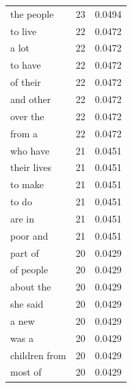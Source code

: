 \begin{tabular}{lrl}
the people & 23 & 0.0494 \\
to live & 22 & 0.0472 \\
a lot & 22 & 0.0472 \\
to have & 22 & 0.0472 \\
of their & 22 & 0.0472 \\
and other & 22 & 0.0472 \\
over the & 22 & 0.0472 \\
from a & 22 & 0.0472 \\
who have & 21 & 0.0451 \\
their lives & 21 & 0.0451 \\
to make & 21 & 0.0451 \\
to do & 21 & 0.0451 \\
are in & 21 & 0.0451 \\
poor and & 21 & 0.0451 \\
part of & 20 & 0.0429 \\
of people & 20 & 0.0429 \\
about the & 20 & 0.0429 \\
she said & 20 & 0.0429 \\
a new & 20 & 0.0429 \\
was a & 20 & 0.0429 \\
children from & 20 & 0.0429 \\
most of & 20 & 0.0429 \\
\bottomrule
\end{tabular}
